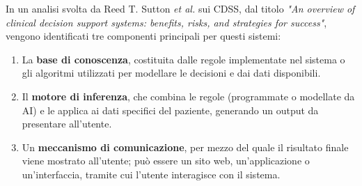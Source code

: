 In un analisi svolta da Reed T. Sutton \textit{et al.}  sui CDSS, dal titolo \textit{"An overview of clinical decision support systems: benefits, risks, and strategies for success"}\cite{cdss}, vengono identificati tre componenti principali per questi sistemi:

\begin{enumerate}
    \item La \textbf{base di conoscenza}, costituita dalle regole implementate nel sistema o gli algoritmi utilizzati per modellare le decisioni e dai dati disponibili. 
    \item Il \textbf{motore di inferenza}, che combina le regole (programmate o modellate da AI) e le applica ai dati specifici del paziente, generando un output da presentare all'utente.
    \item Un \textbf{meccanismo di comunicazione}, per mezzo del quale il risultato finale viene mostrato all'utente; può essere un sito web, un’applicazione o un’interfaccia, tramite cui l’utente interagisce con il sistema.
\end{enumerate}

